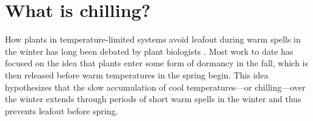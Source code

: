 \documentclass[11pt]{article}
\providecommand{\DIFdelbegin}{} %
\providecommand{\DIFdelend}{} %
\newcommand{\DIFscaledelfig}{0.5}
\newlength{\DIFdelgraphicswidth} %
\newlength{\DIFdelgraphicsheight} %
\newcommand{\DIFdelincludegraphics}[2][]{%
\sbox{\DIFdelgraphicsbox}{\DIFOincludegraphics[#1]{#2}}%
\settoboxwidth{\DIFdelgraphicswidth}{\DIFdelgraphicsbox} %
\settoboxtotalheight{\DIFdelgraphicsheight}{\DIFdelgraphicsbox} %
\scalebox{\DIFscaledelfig}{%
\parbox[b]{\DIFdelgraphicswidth}{\usebox{\DIFdelgraphicsbox}\\[-\baselineskip] \rule{\DIFdelgraphicswidth}{0em}}\llap{\resizebox{\DIFdelgraphicswidth}{\DIFdelgraphicsheight}{%
\setlength{\unitlength}{\DIFdelgraphicswidth}%
\begin{picture}(1,1)%
\thicklines\linethickness{2pt} %
{\color[rgb]{1,0,0}\put(0,0){\framebox(1,1){}}}%
{\color[rgb]{1,0,0}\put(0,0){\line( 1,1){1}}}%
{\color[rgb]{1,0,0}\put(0,1){\line(1,-1){1}}}%
\end{picture}%
}\hspace*{3pt}}} %
} %
\DeclareRobustCommand{\DIFdelbegin}{\DIFOdelbegin \let\includegraphics\DIFdelincludegraphics} %
\DeclareRobustCommand{\DIFdelend}{\DIFOaddend \let\includegraphics\DIFOincludegraphics} %
\begin{document}
\section*{What is chilling?}
\DIFdelbegin %

\DIFdelend How plants in temperature-limited systems avoid leafout during warm spells in the winter has long been debated by plant biologists \citep[e.g.,][]{lamb1948effect,weinberger}. Most work to date has focused on the idea that plants enter some form of dormancy in the fall, which is then released before warm temperatures in the spring begin. This idea hypothesizes that the slow accumulation of cool temperatures---or chilling---over the winter extends through periods of short warm spells in the winter and thus prevents leafout before spring. 
\end{document}
